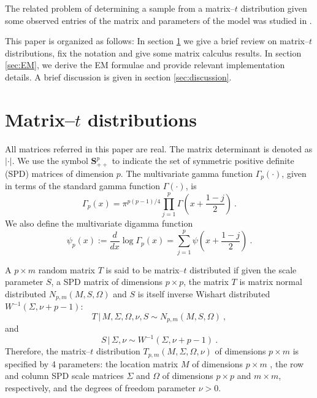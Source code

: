 \documentclass[english,listof=totoc]{scrartcl}
\begin{document}
The related problem of determining a sample from a matrix--$t$
distribution given some observed entries of the matrix and parameters
of the model was studied in \cite{NIPS2007_3203}.

This paper is organized as follows: In section \ref{sec:matrixt} we
give a brief review on matrix--$t$ distributions, fix the notation and
give some matrix calculus results. In section \ref{sec:EM}, we derive
the EM formulae and provide relevant implementation details.  A brief
discussion is given in section \ref{sec:discussion}.

\section{Matrix--$t$ distributions}\label{sec:matrixt}

All matrices referred in this paper are real. The matrix determinant
is denoted as $|\cdot|$. We use the symbol $\mathbf{S}_{++}^p$ to
indicate the set of symmetric positive definite (SPD) matrices of
dimension $p$. The multivariate gamma function $\Gamma_{p}(\cdot)$,
given in terms of the standard gamma function $\Gamma(\cdot)$, is
%
\begin{equation}
\Gamma_{p}(x)=\pi^{p(p-1)/4}\prod_{j=1}^{p}\Gamma\left(x+\frac{1-j}{2}\right)
\ .\label{eq:multgammadef}
\end{equation}
%
We also define the multivariate digamma function
%
\begin{equation}
\psi_{p}(x):=\frac{d}{dx}\log\Gamma_{p}(x)=%
\sum_{j=1}^{p}\psi\left(x+\frac{1-j}{2}\right)\ .
\end{equation}

A $p
\times m$ random matrix $T$ is said to be matrix--$t$ distributed if
given the scale parameter $S$, a SPD matrix of dimensions $p\times p$,
the matrix $T$ is matrix normal distributed $N_{p,m}(M,S,\Omega)$ and
$S$ is itself inverse Wishart distributed $W^{-1}(\Sigma,\nu +p -1)$:
%
\begin{equation}
T\,|\,M,\Sigma,\Omega,\nu,S \sim N_{p,m}(M,S,\Omega) \ ,\label{eq:tdef1}
\end{equation}
and
\begin{equation}
S\,|\,\Sigma,\nu \sim W^{-1}(\Sigma,\nu+p-1)\ .\label{eq:tdef2}
\end{equation}
%
Therefore, the matrix--$t$ distribution $T_{p,m}(M,\Sigma,\Omega,\nu)$
of dimensions $p\times m$ is specified by 4 parameters: the location
matrix $M$ of dimensions $p\times m$ , the row and column SPD scale
matrices $\Sigma$ and $\Omega$ of dimensions $p\times p$ and $m\times
m$, respectively, and the degrees of freedom parameter $\nu>0$.
\end{document}
